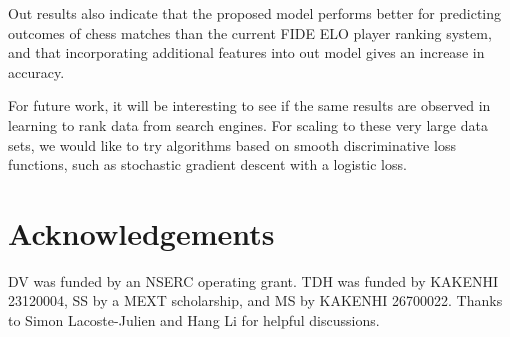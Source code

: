 \documentclass[twoside,11pt]{article}
\begin{document}
Out results also indicate that the proposed model performs better for
predicting outcomes of chess matches than the current FIDE ELO player
ranking system, and that incorporating additional features into out
model gives an increase in accuracy.

For future work, it will be interesting to see if the same results are
observed in learning to rank data from search engines. For scaling to
these very large data sets, we would like to try algorithms based on
smooth discriminative loss functions, such as stochastic gradient
descent with a logistic loss.

\section*{Acknowledgements}
DV was funded by an NSERC operating grant. TDH was funded by KAKENHI 23120004, SS by a
MEXT scholarship, and MS by KAKENHI 26700022. 
Thanks to Simon Lacoste-Julien and Hang Li for helpful discussions.




\end{document}
